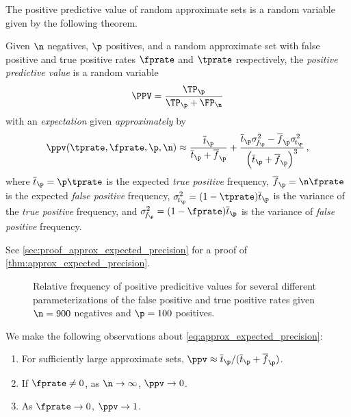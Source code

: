 \documentclass[ ../main.tex]{subfiles}
\begin{document}
The positive predictive value of random approximate sets is a random variable given by the following theorem.
\begin{theorem}
	\label{thm:approx_expected_precision}
	Given $\n$ negatives, $\p$ positives, and a random approximate set with false positive and true positive rates $\fprate$ and $\tprate$ respectively, the \emph{positive predictive value} is a random variable
	\begin{equation}
		\PPV = \frac{\TP_{\p}}{\TP_{\p} + \FP_{\n}}
	\end{equation}
	with an \emph{expectation} given \emph{approximately} by
	\begin{equation}
		\label{eq:approx_expected_precision}
		\ppv(\tprate, \fprate, \p, \n) \approx 
		\frac{\overline{t}_\p}{\overline{t}_\p + \overline{f}_\p} +
		\frac{\overline{t}_\p \sigma_{\!f_\p}^2 - \overline{f}_\p 
		\sigma_{\!t_\p}^2}{\left(\overline{t}_\p + \overline{f}_\p\right)^3}\,,
	\end{equation}
	where $\overline{t}_\p = \p \tprate$ is the expected \emph{true positive} frequency, $\overline{f}_\p =  \n \fprate$ is the expected \emph{false positive} frequency, $\sigma_{\!t_\p}^2 = (1-\tprate) \overline{t}_\p$ is the variance of the \emph{true positive} frequency, and $\sigma_{\!f_\p}^2 = (1-\fprate) \overline{t}_\p$ is the variance of \emph{false positive} frequency.
\end{theorem}
See \cref{sec:proof_approx_expected_precision} for a proof of 
\cref{thm:approx_expected_precision}.

\begin{figure}
	\def\svgwidth{\columnwidth}
	\centering
	\captionsetup{justification=centering}
	\caption
	{
		Relative frequency of positive predicitive values for several different parameterizations of the false positive and true positive rates given $\n = 900$ negatives and $\p=100$ positives.
	}    
	
	\label{fig:prec_vs_fprate_and_fnrate}
\end{figure}

We make the following observations about \cref{eq:approx_expected_precision}:
\begin{enumerate}
	\item For sufficiently large approximate sets, $\ppv \approx 
	\overline{t}_\p / (\overline{t}_\p + \overline{f}_\p)$.
	\item If $\fprate \neq 0$, as $\n \to \infty$, $\ppv \to 0$.
	\item As $\fprate \to 0$, $\ppv \to 1$.
\end{enumerate}
\end{document}
